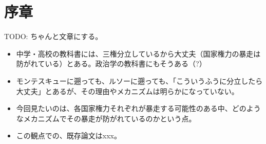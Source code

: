 \documentclass[main.tex]{subfiles}
\begin{document}
\section*{序章}
\setcounter{page}{1}

TODO: ちゃんと文章にする。\\
\begin{itemize}
  \item 中学・高校の教科書には、三権分立しているから大丈夫（国家権力の暴走は防がれている）とある。政治学の教科書にもそうある（?）
  \item モンテスキューに遡っても、ルソーに遡っても、「こういうふうに分立したら大丈夫」とあるが、その理由やメカニズムは明らかになっていない。
  \item 今回見たいのは、各国家権力それぞれが暴走する可能性のある中、どのようなメカニズムでその暴走が防がれているのかという点。
  \item この観点での、既存論文はxxx。
\end{itemize}
\end{document}
